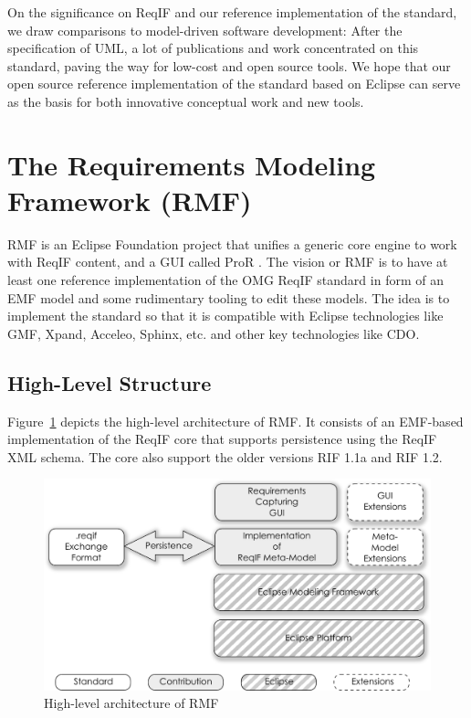 \documentclass{template/openetcs_report}
\begin{document}
On the significance on ReqIF and our reference implementation of the standard, we draw comparisons to model-driven software development: After the specification of UML, a lot of publications and work concentrated on this standard, paving the way for low-cost and open source tools. We hope that our open source reference implementation of the standard based on Eclipse can serve as the basis for both innovative conceptual work and new tools.

\section{The Requirements Modeling Framework (RMF)}

RMF is an Eclipse Foundation project that unifies a generic core engine to work with ReqIF content, and a GUI called ProR \cite{RMF}.  The vision or RMF is to have at least one reference implementation of the OMG ReqIF standard in form of an EMF model and some rudimentary tooling to edit these models. The idea is to implement the standard so that it is compatible with Eclipse technologies like GMF, Xpand, Acceleo, Sphinx, etc. and other key technologies like CDO.

\subsection{High-Level Structure}

Figure~\ref{fig:architecture} depicts the high-level architecture of RMF. It consists of an EMF-based implementation of the ReqIF core that supports persistence using the ReqIF XML schema.  The core also support the older versions RIF 1.1a and RIF 1.2.

\begin{figure}[h!t]
	\begin{center}
	\includegraphics[width=\textwidth]{img/architecture.pdf}
	\end{center}
	\caption{High-level architecture of RMF}
	\label{fig:architecture}
\end{figure}
\end{document}
